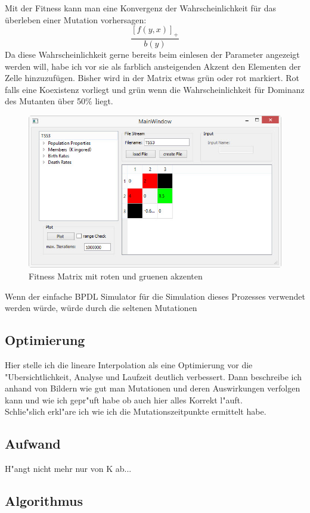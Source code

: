 \documentclass[11pt, a4paper, german]{article}
\begin{document}
Mit der Fitness kann man eine Konvergenz der Wahrscheinlichkeit für das überleben einer Mutation vorhersagen:
\[ \frac{\left[ f(y,x)\right]_+ }{b(y)} \]
Da diese Wahrscheinlichkeit gerne bereits beim einlesen der Parameter angezeigt werden will, habe ich vor sie als farblich ansteigenden Akzent den Elementen der Zelle hinzuzufügen. Bisher wird in der Matrix etwas grün oder rot markiert. Rot falls eine Koexistenz vorliegt und grün wenn die Wahrscheinlichkeit für Dominanz des Mutanten über 50\% liegt.
\begin{figure}[H]
	\centering
	\includegraphics[width=0.7\linewidth]{./Pictures/MainWindow_red_green_loaded}
	\caption[MainWindow_redGreenFitness]{Fitness Matrix mit roten und gruenen akzenten}
	\label{fig:MainWindow_red_green_loaded}
\end{figure}
Wenn der einfache BPDL Simulator für die Simulation dieses Prozesses verwendet werden würde, würde durch die seltenen Mutationen

	\subsection{Optimierung}
	Hier stelle ich die lineare Interpolation als eine Optimierung vor die "Ubersichtlichkeit, Analyse und Laufzeit deutlich verbessert. Dann beschreibe ich anhand von Bildern wie gut man Mutationen und deren Auswirkungen verfolgen kann und wie ich gepr"uft habe ob auch hier alles Korrekt l"auft.\\
	Schlie"slich erkl"are ich wie ich die Mutationszeitpunkte ermittelt habe.
	
	\subsection{Aufwand}
	H"angt nicht mehr nur von K ab...
	
	\subsection{Algorithmus}
\clearpage
\end{document}
